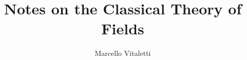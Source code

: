 \documentclass[english, 11pt]{book}
\begin{document}
\newcommand{\quotes}[1]{``#1''}
\newcommand{\sfT}{$\mathsf{T}$}
\newcommand{\udT}{\rotatebox[origin=c]{180}{$\mathsf{T}$}}
\newcommand{\N}{\mathbb{N}}
\newcommand{\Z}{\mathbb{Z}}
\newcommand{\Q}{\mathbb{Q}}
\newcommand{\R}{\mathbb{R}}
\newcommand{\C}{\mathbb{C}}

\DeclareRobustCommand{\rchi}{{\mathpalette\irchi\relax}}
\newcommand{\irchi}[2]{\raisebox{\depth}{$#1\chi$}} %

\def\rcurs{s}
\def\brcurs{\vb{\rcurs}}
\def\hrcurs{\vu{\rcurs}}


\author{Marcello Vitaletti}
\title{Notes on the Classical Theory of Fields\\
{\small }}
\maketitle

\frontmatter%

%

	
\tableofcontents

\mainmatter%


\end{document}
